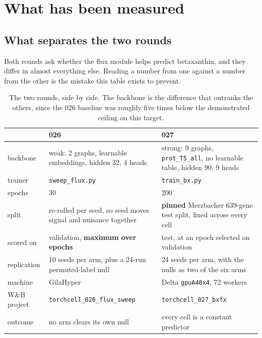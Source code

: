 
\section{What has been measured}
\label{sec:measured}

\subsection{What separates the two rounds}

Both rounds ask whether the flux module helps predict betaxanthin, and they differ in
almost everything else. Reading a number from one against a number from the other is the
mistake this table exists to prevent.

\begin{table}[H]
  \centering
  \footnotesize
  \caption[026 against 027]{The two rounds, side by side. The backbone is the difference
  that outranks the others, since the 026 baseline was roughly five times below the
  demonstrated ceiling on this target.}
  \label{tab:026v027}
  \begin{tabular}{@{}p{}p{}p{}@{}}
    \hline
    & 026 & 027 \\
    \hline
    backbone & weak: 2 graphs, learnable embeddings, hidden 32, 4 heads &
      strong: 9 graphs, \texttt{prot\_T5\_all}, no learnable table, hidden 90, 9 heads \\
    trainer & \texttt{sweep\_flux.py} & \texttt{train\_bx.py} \\
    epochs & 30 & 200 \\
    split & re-rolled per seed, so seed moves signal and nuisance together &
      \textbf{pinned} Merzbacher 639-gene test split, fixed across every cell \\
    scored on & validation, \textbf{maximum over epochs} &
      test, at an epoch selected on validation \\
    replication & 10 seeds per arm, plus a 24-run permuted-label null &
      24 seeds per arm, with the nulls as two of the six arms \\
    machine & GilaHyper & Delta \texttt{gpuA40x4}, 72 workers \\
    W\&B project & \texttt{torchcell\_026\_flux\_sweep} & \texttt{torchcell\_027\_bxfx} \\
    outcome & no arm clears its own null & every cell is a constant predictor \\
    \hline
  \end{tabular}
\end{table}

